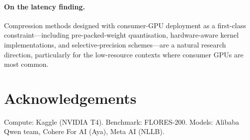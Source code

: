 \documentclass[11pt,a4paper]{article}
\begin{document}
\paragraph{On the latency finding.}
Compression methods designed with consumer-GPU deployment as a
first-class constraint---including pre-packed-weight quantisation,
hardware-aware kernel implementations, and selective-precision
schemes---are a natural research direction, particularly for the
low-resource contexts where consumer GPUs are most common.

\section*{Acknowledgements}

Compute: Kaggle (NVIDIA T4). Benchmark: FLORES-200. Models: Alibaba
Qwen team, Cohere For AI (Aya), Meta AI (NLLB).
\end{document}
